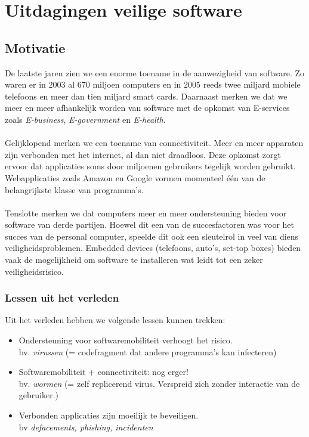 \documentclass[../main.tex]{subfiles}
\begin{document}
\chapter{Uitdagingen veilige software}

\section{Motivatie}
De laatste jaren zien we een enorme toename in de aanwezigheid van software. Zo waren er in 2003 al 670 miljoen computers en in 2005 reeds twee miljard mobiele telefoons en meer dan tien miljard smart cards. Daarnaast merken we dat we meer en meer afhankelijk worden van software met de opkomst van E-services zoals \textit{E-business}, \textit{E-government} en \textit{E-health}. 
\\\\
Gelijklopend merken we een toename van connectiviteit. Meer en meer apparaten zijn verbonden met het internet, al dan niet draadloos. Deze opkomst zorgt ervoor dat applicaties soms door miljoenen gebruikers tegelijk worden gebruikt. Webapplicaties zoals Amazon en Google vormen momenteel \'e\'en van de belangrijkste klasse van programma's.
\\\\
Tenslotte merken we dat computers meer en meer ondersteuning bieden voor software van derde partijen. Hoewel dit een van de succesfactoren was voor het succes van de personal computer, speelde dit ook een sleutelrol in veel van diens veiligheidsproblemen. Embedded devices (telefoons, auto's, set-top boxes) bieden vaak de mogelijkheid om software te installeren wat leidt tot een zeker veiligheidsrisico.

\subsection{Lessen uit het verleden}
Uit het verleden hebben we volgende lessen kunnen trekken:
\begin{itemize}
	\item Ondersteuning voor softwaremobiliteit verhoogt het risico. \\ bv. \textit{virussen} (= codefragment dat andere programma's kan infecteren)
	\item Softwaremobiliteit + connectiviteit: nog erger! \\ bv. \textit{wormen} (= zelf replicerend virus. Verspreid zich zonder interactie van de gebruiker.)
	\item Verbonden applicaties zijn moeilijk te beveiligen. \\ bv \textit{defacements, phishing, incidenten}
\end{itemize}
\end{document}

